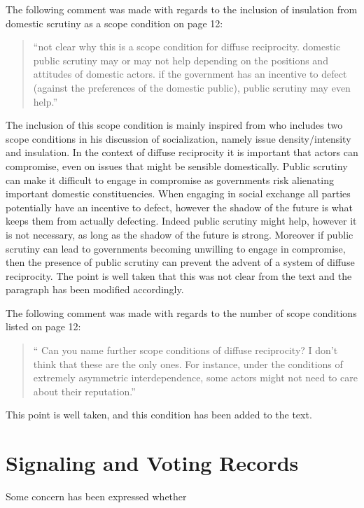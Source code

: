 \documentclass{article}
\begin{document}
The following comment was made with regards to the inclusion of insulation from domestic scrutiny as a scope condition on page 12:

\begin{quote}
  ``not clear why this is a scope condition for diffuse reciprocity. domestic public scrutiny may or may not help depending on the positions and attitudes of domestic actors. if the government has an incentive to defect (against the preferences of the  domestic public), public scrutiny may even help.''
\end{quote}

The inclusion of this scope condition is mainly inspired from \citet{Lewis2005} who includes two scope conditions in his discussion of socialization, namely issue density/intensity and insulation. In the context of diffuse reciprocity it is important that actors can compromise, even on issues that might be sensible domestically. Public scrutiny can make it difficult to engage in compromise as governments risk alienating important domestic constituencies. When engaging in social exchange all parties potentially have an incentive to defect, however the shadow of the future is what keeps them from actually defecting. Indeed public scrutiny might help, however it is not necessary, as long as the shadow of the future is strong. Moreover if public scrutiny can lead to governments becoming unwilling to engage in compromise, then the presence of public scrutiny can prevent the advent of a system of diffuse reciprocity. The point is well taken that this was not clear from the text and the paragraph has been modified accordingly.

The following comment was made with regards to the number of scope conditions listed on page 12:

\begin{quote}
 `` Can you name further scope conditions of diffuse reciprocity? I don't think that these are the only ones. For instance, under the conditions of extremely asymmetric interdependence, some actors might not need to care about their reputation.''
\end{quote}

This point is well taken, and this condition has been added to the text.

\section{Signaling and Voting Records}

Some concern has been expressed whether 
\end{document}
